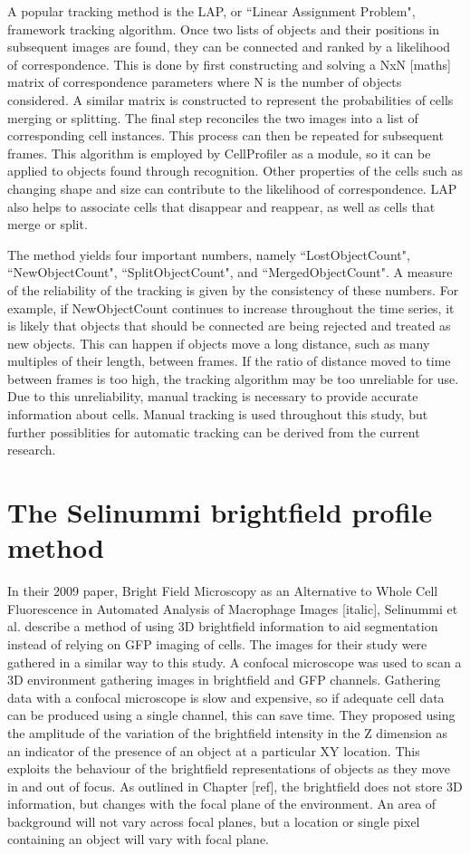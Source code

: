 A popular tracking method is the LAP, or ``Linear Assignment Problem", framework tracking algorithm. Once two lists of objects and their positions in subsequent images are found, they can be connected and ranked by a likelihood of correspondence. This is done by first constructing and solving a NxN [maths] matrix of correspondence parameters where N is the number of objects considered. A similar matrix is constructed to represent the probabilities of cells merging or splitting. The final step reconciles the two images into a list of corresponding cell instances. This process can then be repeated for subsequent frames. This algorithm is employed by CellProfiler as a module, so it can be applied to objects found through recognition. Other properties of the cells such as changing shape and size can contribute to the likelihood of correspondence. LAP also helps to associate cells that disappear and reappear, as well as cells that merge or split.

The method yields four important numbers, namely ``LostObjectCount", ``NewObjectCount", ``SplitObjectCount", and ``MergedObjectCount". A measure of the reliability of the tracking is given by the consistency of these numbers. For example, if NewObjectCount continues to increase throughout the time series, it is likely that objects that should be connected are being rejected and treated as new objects. This can happen if objects move a long distance, such as many multiples of their length, between frames. If the ratio of distance moved to time between frames is too high, the tracking algorithm may be too unreliable for use. Due to this unreliability, manual tracking is necessary to provide accurate information about cells. Manual tracking is used throughout this study, but further possiblities for automatic tracking can be derived from the current research.

\section{The Selinummi brightfield profile method}

In their 2009 paper, Bright Field Microscopy as an Alternative to Whole Cell Fluorescence in Automated Analysis of Macrophage Images [italic], Selinummi et al. describe a method of using 3D brightfield information to aid segmentation instead of relying on GFP imaging of cells. The images for their study were gathered in a similar way to this study. A confocal microscope was used to scan a 3D environment gathering images in brightfield and GFP channels. Gathering data with a confocal microscope is slow and expensive, so if adequate cell data can be produced using a single channel, this can save time. They proposed using the amplitude of the variation of the brightfield intensity in the Z dimension as an indicator of the presence of an object at a particular XY location. This exploits the behaviour of the brightfield representations of objects as they move in and out of focus. As outlined in Chapter [ref], the brightfield does not store 3D information, but changes with the focal plane of the environment. An area of background will not vary across focal planes, but a location or single pixel containing an object will vary with focal plane.

